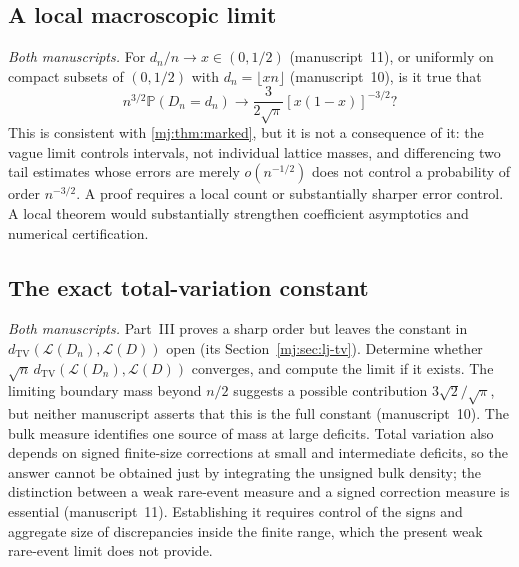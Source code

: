 \documentclass[11pt,a4paper]{article}
\theoremstyle{definition}\newaliascnt{definition}{theorem}
\theoremstyle{remark}\newaliascnt{remark}{theorem}
\newcommand{\ljP}{\mathbb P}
\newcommand{\ljTV}{d_{\mathrm{TV}}}
\newcommand{\ljLaw}{\mathcal L}
\begin{document}
\subsection{A local macroscopic limit}
\label{cjm:sec:mj-local}
\emph{Both manuscripts.} For $d_n/n\to x\in(0,1/2)$ (manuscript~11), or
uniformly on compact subsets of $(0,1/2)$ with $d_n=\lfloor xn\rfloor$
(manuscript~10), is it true that
\[
 n^{3/2}\ljP(D_n=d_n)\longrightarrow\frac3{2\sqrt\pi}[x(1-x)]^{-3/2}?
\]
This is consistent with \cref{mj:thm:marked}, but it is not a consequence of
it: the vague limit controls intervals, not individual lattice masses, and
differencing two tail estimates whose errors are merely $o(n^{-1/2})$ does not
control a probability of order $n^{-3/2}$. A proof requires a local count or
substantially sharper error control. A local theorem would substantially
strengthen coefficient asymptotics and numerical certification.

\subsection{The exact total-variation constant}
\label{cjm:sec:mj-tv}
\emph{Both manuscripts.} Part~III proves a sharp order but leaves the constant
in $\ljTV(\ljLaw(D_n),\ljLaw(D))$ open (its Section~\ref{mj:sec:lj-tv}).
Determine whether $\sqrt n\,\ljTV(\ljLaw(D_n),\ljLaw(D))$ converges, and
compute the limit if it exists. The limiting boundary mass beyond $n/2$
suggests a possible contribution $3\sqrt2/\sqrt\pi$, but neither manuscript
asserts that this is the full constant (manuscript~10). The bulk measure
identifies one source of mass at large deficits. Total variation also depends
on signed finite-size corrections at small and intermediate deficits, so the
answer cannot be obtained just by integrating the unsigned bulk density; the
distinction between a weak rare-event measure and a signed correction measure
is essential (manuscript~11). Establishing it requires control of the signs
and aggregate size of discrepancies inside the finite range, which the
present weak rare-event limit does not provide.
\end{document}

